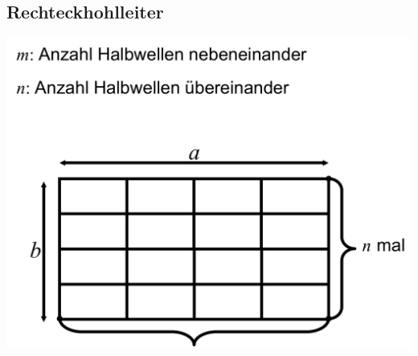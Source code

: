 \subsection{Rechteckhohlleiter}
\includegraphics[width=.35\paperheight]{content/fuw/pictures/fuw_rechteckhohlleiter.png}
